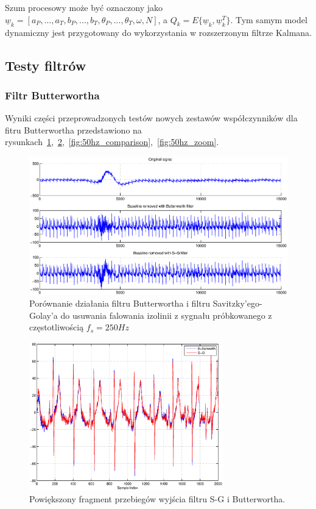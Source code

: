 Szum procesowy może być oznaczony jako $\underline{w}_k = \left[ a_P,...,a_T,b_P,...,b_T, \theta_P,...,\theta_T,\omega,N \right]$, a $Q_k = E \{\underline{w}_k, \underline{w}_k^T \}$. Tym samym model dynamiczny jest przygotowany do wykorzystania w rozszerzonym filtrze Kalmana.

\subsection{Testy filtrów}

\subsubsection{Filtr Butterwortha}

Wyniki części przeprowadzonych testów nowych zestawów współczynników dla fitru Butterwortha przedstawiono na rysunkach~\ref{fig:bw_removal_comparison},~\ref{fig:bw_removal_zoom},~\ref{fig:50hz_comparison},~\ref{fig:50hz_zoom}.

\begin{figure}[H]
\centering
	\includegraphics[width=\textwidth]{ECG_BASELINE/figures/250_baseline_comparison.eps}
\caption{Porównanie działania filtru Butterwortha i filtru Savitzky'ego-Golay'a do usuwania falowania izolinii z sygnału próbkowanego z częstotliwością $f_s=250 Hz$}
\label{fig:bw_removal_comparison}
\end{figure}

\begin{figure}[H]
\centering
	\includegraphics[width=0.75\textwidth]{ECG_BASELINE/figures/zoom_butter_sg.eps}
\caption{Powiększony fragment przebiegów wyjścia filtru S-G i Butterwortha.}
\label{fig:bw_removal_zoom}
\end{figure}

